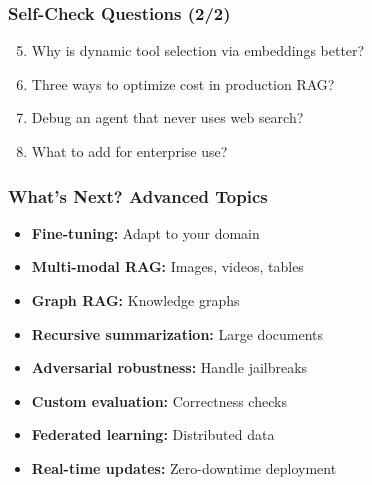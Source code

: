 \documentclass[aspectratio=169,11pt]{beamer}
\begin{document}
\begin{frame}
  \frametitle{Self-Check Questions (2/2)}

  \begin{enumerate}
    \setcounter{enumi}{4}
    \item Why is dynamic tool selection via embeddings better?
    \vspace{0.3cm}
    \item Three ways to optimize cost in production RAG?
    \vspace{0.3cm}
    \item Debug an agent that never uses web search?
    \vspace{0.3cm}
    \item What to add for enterprise use?
    \vspace{0.3cm}
  \end{enumerate}
\end{frame}

\begin{frame}
  \frametitle{What's Next? Advanced Topics}

  \begin{itemize}
    \item \textbf{Fine-tuning:} Adapt to your domain
    \item \textbf{Multi-modal RAG:} Images, videos, tables
    \item \textbf{Graph RAG:} Knowledge graphs
    \item \textbf{Recursive summarization:} Large documents
    \item \textbf{Adversarial robustness:} Handle jailbreaks
    \item \textbf{Custom evaluation:} Correctness checks
    \item \textbf{Federated learning:} Distributed data
    \item \textbf{Real-time updates:} Zero-downtime deployment
  \end{itemize}
\end{frame}
\end{document}
